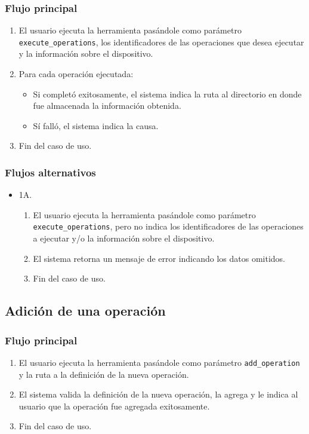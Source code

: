 \subsubsection*{Flujo principal}
\begin{enumerate}
\item \begin{sloppypar} El usuario ejecuta la herramienta pasándole como parámetro \texttt{execute\_operations}, los identificadores de las operaciones que desea ejecutar y la información sobre el dispositivo.\end{sloppypar}
\item Para cada operación ejecutada:
    \begin{itemize}
    \item Si completó exitosamente, el sistema indica la ruta al directorio en donde fue almacenada la información obtenida.
    \item Sí falló, el sistema indica la causa.
    \end{itemize}
\item Fin del caso de uso.
\end{enumerate}

\subsubsection*{Flujos alternativos}
\begin{itemize}
\item 1A.
    \begin{enumerate}
    \item \begin{sloppypar} El usuario ejecuta la herramienta pasándole como parámetro \texttt{execute\_operations}, pero no indica los identificadores de las operaciones a ejecutar y/o la información sobre el dispositivo.\end{sloppypar}
    \item El sistema retorna un mensaje de error indicando los datos omitidos.
    \item Fin del caso de uso.
    \end{enumerate}
\end{itemize}

\subsection{Adición de una operación}

\subsubsection*{Flujo principal}
\begin{enumerate}
\item \begin{sloppypar} El usuario ejecuta la herramienta pasándole como parámetro \texttt{add\_operation} y la ruta a la definición de la nueva operación.\end{sloppypar}
\item El sistema valida la definición de la nueva operación, la agrega y le indica al usuario que la operación fue agregada exitosamente.
\item Fin del caso de uso.
\end{enumerate}

